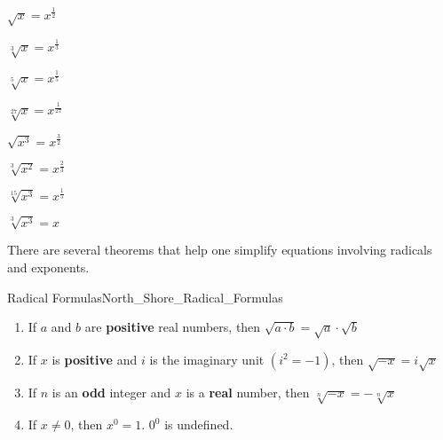 \documentclass[crop=false,class=book,oneside]{standalone}                      %
\begin{document}
            \begin{fexample}{}{}
                \begin{enumerate}
                    \begin{multicols}{4}
                        \item $\sqrt{x}=x^{\frac{1}{2}}$
                        \item $\sqrt[3]{x}=x^{\frac{1}{3}}$
                        \item $\sqrt[5]{x}=x^{\frac{1}{5}}$
                        \item $\sqrt[27]{x}=x^{\frac{1}{27}}$
                        \item $\sqrt{x^3}=x^{\frac{3}{2}}$
                        \item $\sqrt[3]{x^2}=x^{\frac{2}{3}}$
                        \item $\sqrt[15]{x^3}=x^{\frac{1}{5}}$
                        \item $\sqrt[3]{x^3}=x$
                    \end{multicols}
                \end{enumerate}
            \end{fexample}
            There are several theorems that help one simplify
            equations involving radicals and exponents.
            \begin{ftheorem}{Radical Formulas}{North_Shore_Radical_Formulas}
                \begin{enumerate}
                    \item If $a$ and $b$ are \textbf{positive} real numbers,
                          then $\sqrt{{a}\cdot{b}}=\sqrt{a}\cdot\sqrt{b}$
                    \item If $x$ is \textbf{positive} and $i$ is the
                          imaginary unit $(i^{2}=-1)$, then $\sqrt{-x}=i\sqrt{x}$
                    \item If $n$ is an \textbf{odd} integer
                          and $x$ is a \textbf{real} number,
                          then $\sqrt[n]{-x}=-\sqrt[n]{x}$
                    \item If $x\ne{0}$, then $x^{0}=1$. $0^{0}$ is undefined.
                \end{enumerate}
            \end{ftheorem}
\end{document}
